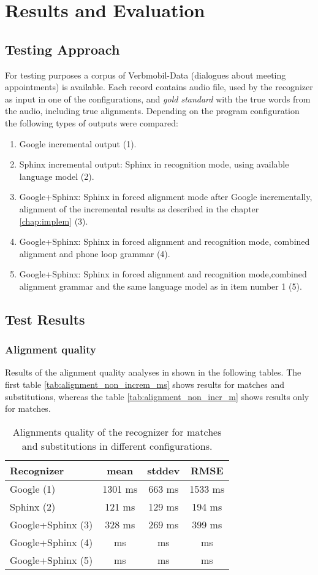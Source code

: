 \chapter{Results and Evaluation}
\label{chap:res}
 \section {Testing Approach} 
For testing purposes  a corpus of  Verbmobil-Data (dialogues about meeting
appointments)  is available.  Each record contains audio file, used by the recognizer as input in
one of the configurations,  and \textit {gold standard}
with the true words from the audio, including true alignments.  Depending on the program configuration 
 the following types of outputs were compared:
\begin {enumerate}
  \item Google incremental output (1).
  \item Sphinx incremental output: Sphinx in recognition mode, using available
  language model (2).
  \item Google+Sphinx: Sphinx in forced alignment mode after Google
  incrementally, alignment of the incremental results as described in the
  chapter \ref {chap:implem} (3).
  \item Google+Sphinx: Sphinx in forced alignment and recognition mode,
  combined alignment and phone loop grammar (4).
  \item Google+Sphinx: Sphinx in forced alignment and recognition mode,combined
  alignment grammar and the same language model as in item number 1 (5). 
\end{enumerate}
\section {Test Results} 
\subsection {Alignment quality}
Results of the alignment quality analyses in shown in the following tables.  The
first table \ref{tab:alignment_non_increm_ms} shows results for matches and
substitutions, whereas the table \ref{tab:alignment_non_incr_m} shows results
only for matches. 
\begin {table}
\label{tab:alignment_non_increm} 
\begin{center}
\caption {Alignments quality of the recognizer for matches and substitutions in
different configurations.}
    \begin{tabular}{l  c  c  c }
   \toprule
    Recognizer & mean & stddev & RMSE \\ \toprule
    Google (1)  & 1301 ms &  663 ms & 1533 ms \\ 
    Sphinx (2)  & 121 ms & 129 ms & 194 ms \\ 
    Google+Sphinx (3)  &  328  ms & 269 ms &  399 ms \\ 
    Google+Sphinx (4)  & ms & ms & ms \\ 
    Google+Sphinx (5)  & ms & ms & ms \\ \bottomrule  
    \end{tabular}
\end{center}
\end {table}

